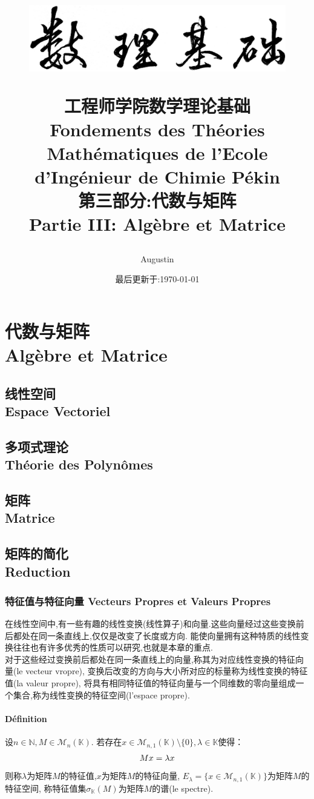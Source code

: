 \documentclass[12pt, a4paper, oneside]{ctexbook}
\title{
\vspace{-2cm}
  \begin{figure}[!t]%
    \centering
    \includegraphics[width=14cm]{shulijichu-2.png}
  \end{figure}
  \vspace{-2cm}
  {\Huge{\textbf{工程师学院数学理论基础\\
Fondements des Théories Mathématiques de l'Ecole d'Ingénieur de Chimie Pékin\\
第三部分:代数与矩阵\\
Partie III: Algèbre et Matrice
}}}
}
\author{Augustin}
\date{最后更新于:\today}
\begin{document}
\vspace{-3cm}
\maketitle
\tableofcontents
\else
\part{代数与矩阵\\ Algèbre et Matrice}
\fi
\chapter{线性空间 \\Espace Vectoriel}

\chapter{多项式理论\\ Théorie des Polynômes}
\chapter{矩阵 \\ Matrice}
\chapter{矩阵的简化\\Reduction}
\section{特征值与特征向量 Vecteurs Propres et Valeurs Propres}
  在线性空间中,有一些有趣的线性变换(线性算子)和向量.这些向量经过这些变换前后都处在同一条直线上,仅仅是改变了长度或方向.
  能使向量拥有这种特质的线性变换往往也有许多优秀的性质可以研究,也就是本章的重点.\\
  
  对于这些经过变换前后都处在同一条直线上的向量,称其为对应线性变换的特征向量(le vecteur vropre),
  变换后改变的方向与大小所对应的标量称为线性变换的特征值(la valeur propre),
  将具有相同特征值的特征向量与一个同维数的零向量组成一个集合,称为线性变换的特征空间(l'espace propre).
  \subsection{Définition}
  设$n\in\mathbb{N} , M\in \mathcal{M}_n(\mathbb{K})$.
  若存在$x\in \mathcal{M}_{n,1}(\mathbb{K})\setminus\{0\}, \lambda\in\mathbb{K}$使得：
  \begin{equation}
    \notag
    Mx=\lambda x
  \end{equation}
  则称$\lambda$为矩阵$M$的特征值,$x$为矩阵$M$的特征向量,
  $E_\lambda=\{x\in\mathcal{M}_{n,1}(\mathbb{K})\}$为矩阵$M$的特征空间,
  称特征值集$\sigma_{\mathbb{K}}(M)$为矩阵$M$的谱(le spectre).\\
\end{document}
